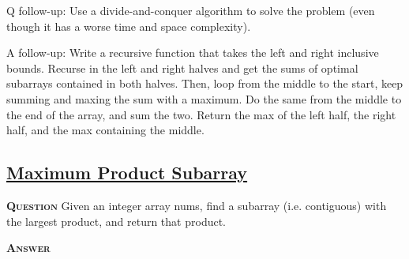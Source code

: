\documentclass[table, xcdraw]{article}%
\begin{document}
Q follow-up: Use a divide-and-conquer algorithm to solve the problem (even though it has a worse time and space complexity).

A follow-up: Write a recursive function that takes the left and right inclusive bounds. Recurse in the left and right halves and get the sums of optimal subarrays contained in both halves. Then, loop from the middle to the start, keep summing and maxing the sum with a maximum. Do the same from the middle to the end of the array, and sum the two. Return the max of the left half, the right half, and the max containing the middle.

\subsection{\href{https://leetcode.com/problems/maximum-product-subarray}{Maximum Product Subarray}}

\textsc{\textbf{Question}} Given an integer array nums, find a subarray (i.e. contiguous) with the largest product, and return that product.

\textsc{\textbf{Answer}}
\end{document}
